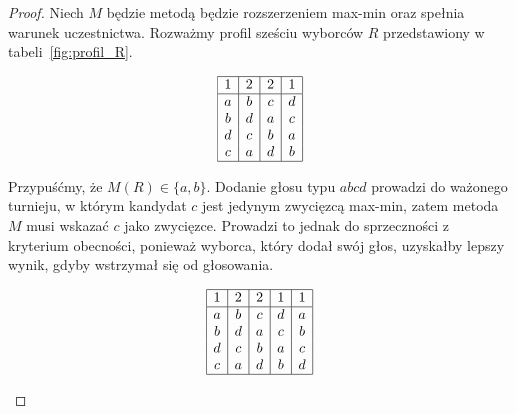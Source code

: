 \documentclass[12pt,a4paper]{mwrep}
\begin{document}
	\begin{proof}
		Niech \(M\) będzie metodą będzie rozszerzeniem max-min oraz spełnia warunek uczestnictwa. Rozważmy profil sześciu wyborców \(R\) przedstawiony w tabeli~\ref{fig:profil_R}.
		
		\begin{table}[H]
			\centering
			\[
			\begin{array}{|c|c|c|c|}
				\hline
				1 & 2 & 2 & 1\\
				\hline
				a & b & c & d\\
				b & d & a & c\\
				d & c & b & a\\
				c & a & d & b\\
				\hline
			\end{array}
			\]
			\caption{Profil preferencji \(R\)}
			\label{fig:profil_R}
		\end{table}
		
		Przypuśćmy, że \(M(R) \in \{a,b\}\). Dodanie głosu typu \(abcd\) prowadzi do ważonego turnieju, w którym kandydat \(c\) jest jedynym zwycięzcą max-min, zatem metoda \(M\) musi wskazać \(c\) jako zwycięzce. Prowadzi to jednak do sprzeczności z kryterium obecności, ponieważ wyborca, który dodał swój głos, uzyskałby lepszy wynik, gdyby wstrzymał się od głosowania.
		
		\begin{table}[H]
			\centering
			\[
			\begin{array}{|c|c|c|c|c|}
				\hline
				1 & 2 & 2 & 1 & 1\\
				\hline
				a & b & c & d & a\\
				b & d & a & c & b\\
				d & c & b & a & c\\
				c & a & d & b & d\\
				\hline
			\end{array}
			\]
			\caption{Profil otrzymany po dodaniu głosu typu \(abcd\)}
			\label{tab:profil_abcd}
		\end{table}
	
		\begin{figure}[H]
			\centering
			
\end{figure}
\end{proof}
\end{document}
